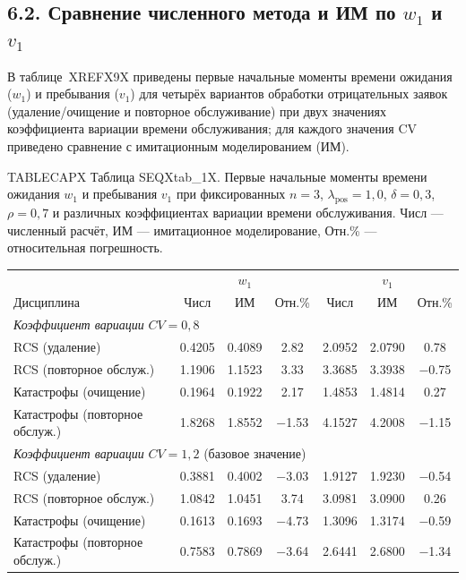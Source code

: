 \subsection*{6.2. Сравнение численного метода и ИМ по \(w_1\) и \(v_1\)}
В таблице~XREFX9X приведены первые начальные моменты времени ожидания (\(w_1\)) и пребывания (\(v_1\)) для четырёх вариантов обработки отрицательных заявок (удаление/очищение и повторное обслуживание) при двух значениях коэффициента вариации времени обслуживания; для каждого значения CV приведено сравнение с имитационным моделированием (ИМ).

\noindent TABLECAPX Таблица SEQXtab_1X. Первые начальные моменты времени ожидания \(w_1\) и пребывания \(v_1\) при фиксированных \(n=3\), \(\lambda_{\text{pos}}=1{,}0\), \(\delta=0{,}3\), \(\rho=0{,}7\) и различных коэффициентах вариации времени обслуживания. Числ --- численный расчёт, ИМ --- имитационное моделирование, Отн.\% --- относительная погрешность.\par



\begin{tabular}{lcccccc}
\toprule
 & \multicolumn{3}{c}{$w_1$} & \multicolumn{3}{c}{$v_1$} \\
 
Дисциплина & Числ & ИМ & Отн.\% & Числ & ИМ & Отн.\% \\
\midrule
\multicolumn{7}{l}{\textit{Коэффициент вариации} $CV=0{,}8$} \\
RCS (удаление) & 0.4205 & 0.4089 & 2.82 & 2.0952 & 2.0790 & 0.78 \\
RCS (повторное обслуж.) & 1.1906 & 1.1523 & 3.33 & 3.3685 & 3.3938 & $-$0.75 \\
Катастрофы (очищение) & 0.1964 & 0.1922 & 2.17 & 1.4853 & 1.4814 & 0.27 \\
Катастрофы (повторное обслуж.) & 1.8268 & 1.8552 & $-$1.53 & 4.1527 & 4.2008 & $-$1.15 \\
\midrule
\multicolumn{7}{l}{\textit{Коэффициент вариации} $CV=1{,}2$ (базовое значение)} \\
RCS (удаление) & 0.3881 & 0.4002 & $-$3.03 & 1.9127 & 1.9230 & $-$0.54 \\
RCS (повторное обслуж.) & 1.0842 & 1.0451 & 3.74 & 3.0981 & 3.0900 & 0.26 \\
Катастрофы (очищение) & 0.1613 & 0.1693 & $-$4.73 & 1.3096 & 1.3174 & $-$0.59 \\
Катастрофы (повторное обслуж.) & 0.7583 & 0.7869 & $-$3.64 & 2.6441 & 2.6800 & $-$1.34 \\
\bottomrule
\end{tabular}




